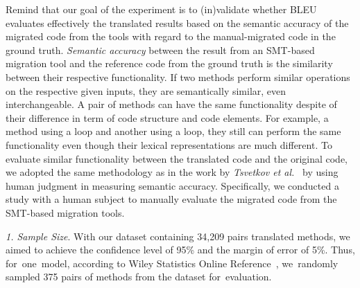 %
Remind that our goal of the experiment is to (in)validate whether BLEU
evaluates effectively the translated results based on the semantic accuracy 
of the migrated code from the tools with regard to the manual-migrated code 
in the ground truth. 
%
{\em Semantic accuracy} between the result from an SMT-based migration
tool and the reference code from the ground truth is the similarity
between their respective functionality. 
%
If two methods perform similar operations on the respective given
inputs, they are semantically similar, even interchangeable. A pair of
methods can have the same functionality despite of their difference in
term of code structure and code elements.
%
For example, a method using a  loop and another using a
 loop, they still can perform the same functionality even
though their lexical representations are much different. 
%
%
To evaluate similar functionality between the translated code and the
original code, we adopted the same methodology as in the work by {\em
  Tsvetkov et al.}~\cite{tsvetkov-acl15} by using human judgment in
measuring semantic accuracy.
%
%
Specifically, we conducted a study with a human subject to manually
evaluate the migrated code from the SMT-based migration tools.


\emph{1. Sample Size}. 
%
With our dataset containing 34,209 pairs translated methods, we aimed
to achieve the confidence level of 95\% and the margin of error of
5\%. Thus, for~one~model, according to Wiley Statistics Online
Reference~\cite{geek_2015}, we~randomly sampled 375 pairs of methods
from the dataset for~evaluation.

